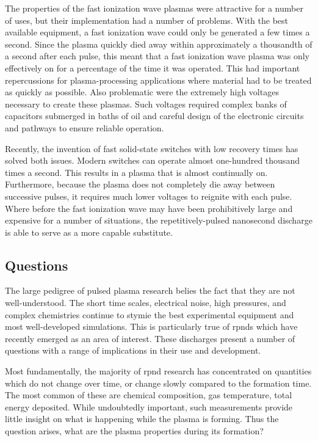 The properties of the fast ionization wave plasmas were attractive for a number
of uses, but their implementation had a number of problems. With the best
available equipment, a fast ionization wave could only be generated a few times
a second. Since the plasma quickly died away within approximately a thousandth
of a second after each pulse, this meant that a fast ionization wave plasma was
only effectively on for a percentage of the time it was operated. This had
important repercussions for plasma-processing applications where material had to
be treated as quickly as possible. Also problematic were the extremely high
voltages necessary to create these plasmas. Such voltages required complex banks
of capacitors submerged in baths of oil and careful design of the electronic
circuits and pathways to ensure reliable operation.

Recently, the invention of fast solid-state switches with low recovery times has
solved both issues. Modern switches can operate almost one-hundred thousand
times a second. This results in a plasma that is almost continually on.
Furthermore, because the plasma does not completely die away between successive
pulses, it requires much lower voltages to reignite with each pulse. Where
before the fast ionization wave may have been prohibitively large and expensive
for a number of situations, the repetitively-pulsed nanosecond discharge is able
to serve as a more capable substitute.

\subsection{Questions}

The large pedigree of pulsed plasma research belies the fact that they are not
well-understood. The short time scales, electrical noise, high pressures, and
complex chemistries continue to stymie the best experimental equipment and most
well-developed simulations. This is particularly true of \acs{rpnd}s which have
recently emerged as an area of interest. These discharges present a number of
questions with a range of implications in their use and development.

Most fundamentally, the majority of \acs{rpnd} research has concentrated on
quantities which do not change over time, or change slowly compared to the
formation time. The most common of these are chemical composition, gas
temperature, total energy deposited. While undoubtedly important, such
measurements provide little insight on what is happening while the plasma is
forming. Thus the question arises, what are the plasma properties during its
formation?

